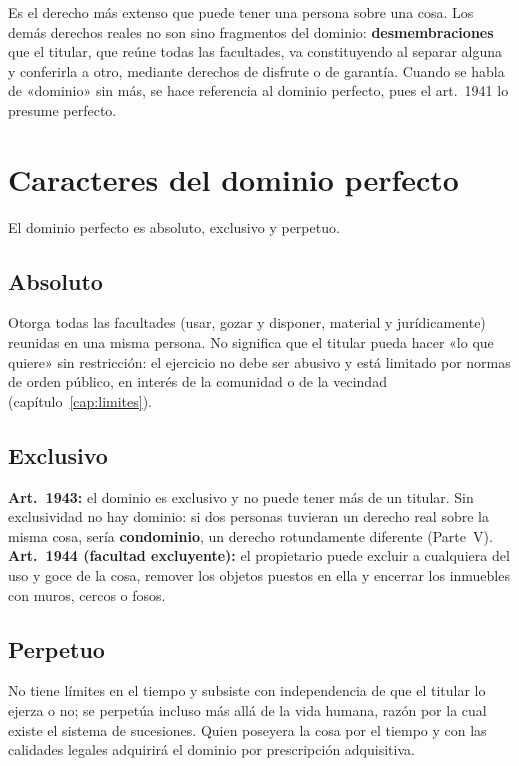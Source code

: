 \documentclass[12pt,oneside]{book}
\begin{document}
Es el derecho más extenso que puede tener una persona sobre una cosa. Los demás derechos reales no son sino fragmentos del dominio: \textbf{desmembraciones} que el titular, que reúne todas las facultades, va constituyendo al separar alguna y conferirla a otro, mediante derechos de disfrute o de garantía. Cuando se habla de «dominio» sin más, se hace referencia al dominio perfecto, pues el art.~1941 lo presume perfecto.

\section{Caracteres del dominio perfecto}

El dominio perfecto es absoluto, exclusivo y perpetuo.

\subsection{Absoluto}

Otorga todas las facultades (usar, gozar y disponer, material y jurídicamente) reunidas en una misma persona. No significa que el titular pueda hacer «lo que quiere» sin restricción: el ejercicio no debe ser abusivo y está limitado por normas de orden público, en interés de la comunidad o de la vecindad (capítulo~\ref{cap:limites}).

\subsection{Exclusivo}

\textbf{Art.~1943:} el dominio es exclusivo y no puede tener más de un titular. Sin exclusividad no hay dominio: si dos personas tuvieran un derecho real sobre la misma cosa, sería \textbf{condominio}, un derecho rotundamente diferente (Parte~V). \textbf{Art.~1944 (facultad excluyente):} el propietario puede excluir a cualquiera del uso y goce de la cosa, remover los objetos puestos en ella y encerrar los inmuebles con muros, cercos o fosos.

\subsection{Perpetuo}

No tiene límites en el tiempo y subsiste con independencia de que el titular lo ejerza o no; se perpetúa incluso más allá de la vida humana, razón por la cual existe el sistema de sucesiones. Quien poseyera la cosa por el tiempo y con las calidades legales adquirirá el dominio por prescripción adquisitiva.
\end{document}
